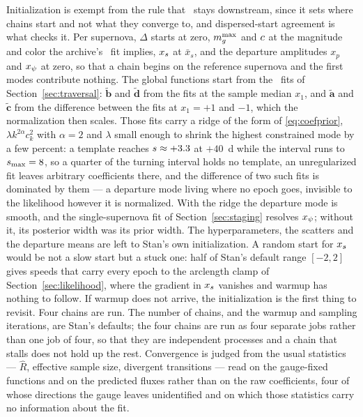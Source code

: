 \documentclass[11pt]{article}
\theoremstyle{plain}
\begin{document}
Initialization is exempt from the rule that \salt\ stays downstream, since it sets where
chains start and not what they converge to, and dispersed-start agreement is what checks
it. Per supernova, $\Delta$ starts at zero, $m_{g}^{\max}$ and $c$ at the magnitude and
color the archive's \salt\ fit implies, $x_{s}$ at $\bar x_{s}$, and the departure
amplitudes $x_p$ and $x_{\psi}$ at zero, so that a chain begins on the reference
supernova and the first modes contribute nothing. The global functions start from the
\salt\ fits of Section~\ref{sec:traversal}: $\tilde{\mathbf{b}}$ and $\tilde{\mathbf{d}}$
from the fits at the sample median $x_{1}$, and $\tilde{\mathbf{a}}$ and
$\tilde{\mathbf{c}}$ from the difference between the fits at $x_{1} = +1$ and $-1$, which
the normalization then scales. Those fits carry a ridge of the form of
\eqref{eq:coefprior}, $\lambda k^{2\alpha}c_{k}^{2}$ with $\alpha = 2$ and $\lambda$
small enough to shrink the highest constrained mode by a few percent: a template reaches
$s \approx +3.3$ at $+40$~d while the interval runs to $s_{\max} = 8$, so a quarter of
the turning interval holds no template, an unregularized fit leaves arbitrary coefficients
there, and the difference of two such fits is dominated by them --- a departure mode living
where no epoch goes, invisible to the likelihood however it is normalized. With the ridge
the departure mode is smooth, and the single-supernova fit of Section~\ref{sec:staging}
resolves $x_{\psi}$; without it, its posterior width was its prior width. The hyperparameters, the scatters and the departure means
are left to Stan's own initialization. A random start for $x_{s}$ would be not a slow
start but a stuck one: half of Stan's default range $[-2, 2]$ gives speeds that carry every
epoch to the arclength clamp of Section~\ref{sec:likelihood}, where the gradient in
$x_{s}$ vanishes and warmup has nothing to follow. If warmup does not arrive, the
initialization is the first thing to revisit. Four chains are run. The number of chains, and the
warmup and sampling iterations, are Stan's defaults; the four chains are run as four
separate jobs rather than one job of four, so that they are independent processes and a
chain that stalls does not hold up the rest. Convergence is judged from the
usual statistics --- $\hat R$, effective sample size, divergent transitions --- read on the
gauge-fixed functions and on the predicted fluxes rather than on the raw coefficients, four
of whose directions the gauge leaves unidentified and on which those statistics carry no
information about the fit.
\end{document}
